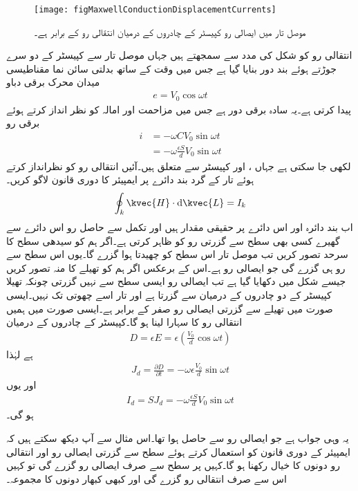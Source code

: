 \begin{figure}
\centering
\texttt{[image: figMaxwellConductionDisplacementCurrents]}
\caption{موصل تار میں ایصالی رو کپیسٹر کے چادروں کے درمیان انتقالی رو کے برابر ہے۔}
\label{شکل_میکس_ویل_ایصالی_انتقالی_رو}
\end{figure}

انتقالی رو کو شکل  کی مدد سے سمجھتے ہیں جہاں موصل تار سے کپیسٹر  کے دو سرے جوڑتے ہوئے بند دور بنایا گیا ہے جس میں وقت کے ساتھ بدلتی سائن نما مقناطیسی میدان  محرک برقی دباو
\begin{align*}
e=V_0 \cos \omega t
\end{align*}
 پیدا کرتی ہے۔یہ سادہ برقی دور ہے جس میں مزاحمت اور امالہ کو نظر انداز کرتے ہوئے برقی رو
\begin{align*}
i&=-\omega C V_0 \sin \omega t\\
&=-\omega \frac{\epsilon S}{d} V_0 \sin \omega t
\end{align*}
لکھی جا سکتی ہے جہاں ،  اور  کپیسٹر سے متعلق ہیں۔آئیں انتقالی رو کو نظرانداز کرتے ہوئے تار کے گرد بند دائرے   پر ایمپیئر کا دوری قانون لاگو کریں۔
\begin{align*}
\oint_k \kvec{H} \cdot \dif \kvec{L}=I_k
\end{align*}
اب بند دائرہ  اور اس دائرے پر  حقیقی مقدار ہیں اور تکمل سے حاصل رو  اس دائرے سے گھیرے کسی بھی سطح سے گزرتی رو کو ظاہر کرتی ہے۔اگر ہم  کو سیدھی سطح کا سرحد تصور کریں تب موصل تار اس سطح کو چھیدتا ہوا گزرے گا۔یوں اس سطح سے  رو ہی گزرے گی جو ایصالی رو ہے۔اس کے برعکس اگر ہم  کو تھیلے کا منہ تصور کریں جیسے شکل میں دکھایا گیا ہے تب ایصالی رو ایسی سطح سے نہیں گزرتی چونکہ تھیلا کپیسٹر کے دو چادروں کے درمیان سے گزرتا ہے اور تار اسے چھوتی تک نہیں۔ایسی صورت میں تھیلے سے گزرتی ایصالی رو صفر کے برابر ہے۔ایسی صورت میں ہمیں انتقالی رو کا سہارا لینا ہو گا۔کپیسٹر کے چادروں کے درمیان
\begin{align*}
D=\epsilon E=\epsilon \left(\frac{V_0}{d} \cos \omega t \right)
\end{align*}
ہے لہٰذا
\begin{align*}
J_d=\frac{\partial D}{\partial t}=-\omega \epsilon \frac{V_0}{d} \sin \omega t
\end{align*}
اور یوں
\begin{align*}
I_d=S J_d =-\omega \frac{\epsilon  S}{d} V_0\sin \omega t 
\end{align*}
ہو گی۔

یہ وہی جواب ہے جو ایصالی رو سے حاصل ہوا تھا۔اس مثال سے آپ دیکھ سکتے ہیں کہ ایمپیئر کے دوری قانون کو استعمال کرتے ہوئے سطح سے  گزرتی ایصالی رو اور انتقالی رو دونوں کا خیال رکھنا ہو گا۔کہیں پر سطح سے صرف ایصالی رو گزرے گی تو کہیں اس سے صرف انتقالی رو گزرے گی اور کبھی کبھار دونوں کا مجموعہ۔

